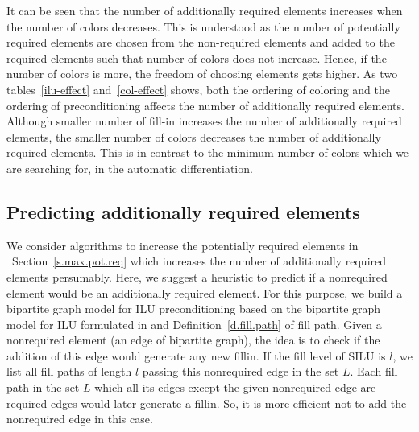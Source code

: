 \documentclass[12pt, twoside,a4paper,toc=bibliography]{scrbook}
\newcommand{\secref}[1]{Section~\protect\ref{#1}}
\newcommand{\defref}[1]{Definition~\protect\ref{#1}}
\begin{document}
It can be seen that the number of additionally required elements increases when
the number of colors decreases. This is understood as the number of potentially
required elements are chosen from the non-required elements and added to the required elements
such that number of colors does not increase. Hence, if the number of colors is more,
the freedom of choosing elements gets higher.
As two tables~\ref{ilu-effect} and~\ref{col-effect} shows,
both the ordering of coloring and the ordering of preconditioning affects the number of
additionally required elements. Although smaller number of fill-in increases
the number of additionally required elements, the smaller number of colors
decreases the number of additionally required elements.
This is in contrast to the minimum number of colors which we are searching for,
in the automatic differentiation.

\subsection{Predicting additionally required elements}
We consider algorithms to increase the potentially required elements in
~\secref{s.max.pot.req} which increases the number of additionally required elements
persumably. Here, we suggest a heuristic to predict if a nonrequired element would be an
additionally required element. For this purpose, we build a bipartite graph model
for ILU preconditioning based on the bipartite graph model for ILU formulated in \cite{Lulfesmann2012Fap}
and \defref{d.fill.path} of fill path. Given a nonrequired element (an edge of bipartite graph),
the idea is to check if the addition of this edge would generate any new fillin.
If the fill level of SILU is $l$, we list all fill paths of length $l$ passing this nonrequired edge
in the set $L$. Each fill path in the set $L$ which all its edges except the given nonrequired edge
are required edges would later generate a fillin. So, it is more efficient not to add the
nonrequired edge in this case.
\end{document}
